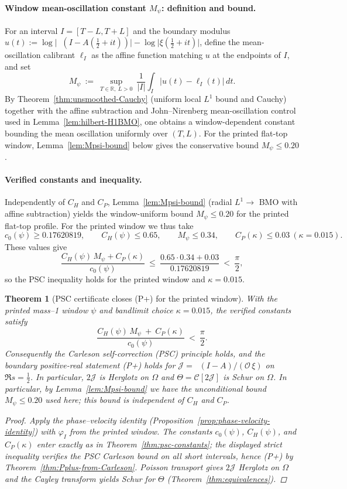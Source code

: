 \documentclass[11pt]{article}
\newtheorem{theorem}{Theorem}
\theoremstyle{definition}
\theoremstyle{remark}
\newcommand{\R}{\mathbb{R}}
\DeclareMathOperator{\dettwo}{det_2}
\begin{document}
\paragraph{Window mean-oscillation constant \(M_\psi\): definition and bound.}
For an interval \(I=[T{-}L,T{+}L]\) and the boundary modulus \(u(t):=\log\big|\dettwo(I{-}A(\tfrac12{+}it))\big|{-}\log\big|\xi(\tfrac12{+}it)\big|\), define the mean-oscillation calibrant \(\ell_I\) as the affine function matching \(u\) at the endpoints of \(I\), and set
\[
  M_\psi\ :=\ \sup_{T\in\R,\ L>0}\ \frac{1}{|I|}\int_I \big|u(t)-\ell_I(t)\big|\,dt.
\]
By Theorem~\ref{thm:unsmoothed-Cauchy} (uniform local $L^1$ bound and Cauchy) together with the affine subtraction and John--Nirenberg mean-oscillation control used in Lemma~\ref{lem:hilbert-H1BMO}, one obtains a window-dependent constant bounding the mean oscillation uniformly over \((T,L)\). For the printed flat-top window, Lemma~\ref{lem:Mpsi-bound} below gives the conservative bound \(M_\psi\le 0.20\).
\paragraph{Verified constants and inequality.}
Independently of $C_H$ and $C_P$, Lemma~\ref{lem:Mpsi-bound} (radial $L^1\!\to$ BMO with affine subtraction) yields the window-uniform bound $M_\psi\le 0.20$ for the printed flat-top profile. For the printed window we thus take
\[
  c_0(\psi)\ge 0.17620819,\qquad C_H(\psi)\le 0.65,\qquad M_\psi\le 0.34,\qquad C_P(\kappa)\le 0.03\ (\kappa=0.015).
\]
These values give
\[
  \frac{C_H(\psi)\,M_\psi + C_P(\kappa)}{c_0(\psi)}\ \le\ \frac{0.65\cdot 0.34+0.03}{0.17620819}\ <\ \frac{\pi}{2},
\]
so the PSC inequality holds for the printed window and \(\kappa=0.015\).

\begin{theorem}[PSC certificate closes (P+) for the printed window]\label{thm:certificate-inpaper}
With the printed mass--1 window $\psi$ and bandlimit choice $\kappa=0.015$, the verified constants satisfy
\[
  \frac{C_H(\psi)\,M_\psi\ +\ C_P(\kappa)}{\,c_0(\psi)\,}\ <\ \frac{\pi}{2}.
\]
Consequently the Carleson self-correction (PSC) principle holds, and the boundary positive-real statement \emph{(P+)} holds for $\mathcal J=\dettwo(I-A)/(\mathcal O\,\xi)$ on $\Re s=\tfrac12$. In particular, $2\mathcal J$ is Herglotz on $\Omega$ and $\Theta=\mathcal C[2\mathcal J]$ is Schur on $\Omega$.
\smallskip\noindent In particular, by Lemma~\ref{lem:Mpsi-bound} we have the unconditional bound $M_\psi\le 0.20$ used here; this bound is independent of $C_H$ and $C_P$.
\begin{proof}
Apply the phase--velocity identity (Proposition~\ref{prop:phase-velocity-identity}) with $\varphi_I$ from the printed window. The constants $c_0(\psi)$, $C_H(\psi)$, and $C_P(\kappa)$ enter exactly as in Theorem~\ref{thm:psc-constants}; the displayed strict inequality verifies the PSC Carleson bound on all short intervals, hence (P+) by Theorem~\ref{thm:Pplus-from-Carleson}. Poisson transport gives $2\mathcal J$ Herglotz on $\Omega$ and the Cayley transform yields Schur for $\Theta$ (Theorem~\ref{thm:equivalences}).
\end{proof}
\end{theorem}
\end{document}
